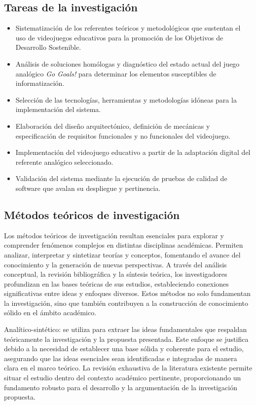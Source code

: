 \subsection*{Tareas de la investigación}

\begin{itemize}
    \item Sistematización de los referentes teóricos y metodológicos que sustentan el uso de videojuegos educativos para la promoción de los Objetivos de Desarrollo Sostenible.
    \item Análisis de soluciones homólogas y diagnóstico del estado actual del juego analógico \textit{Go Goals!} para determinar los elementos susceptibles de informatización.
    \item Selección de las tecnologías, herramientas y metodologías idóneas para la implementación del sistema.
    \item Elaboración del diseño arquitectónico, definición de mecánicas y especificación de requisitos funcionales y no funcionales del videojuego.
    \item Implementación del videojuego educativo a partir de la adaptación digital del referente analógico seleccionado.
    \item Validación del sistema mediante la ejecución de pruebas de calidad de software que avalan su despliegue y pertinencia.
\end{itemize}

\subsection*{Métodos teóricos de investigación}

Los métodos teóricos de investigación resultan esenciales para explorar y comprender fenómenos complejos en distintas disciplinas académicas. Permiten analizar, interpretar y sintetizar teorías y conceptos, fomentando el avance del conocimiento y la generación de nuevas perspectivas. A través del análisis conceptual, la revisión bibliográfica y la síntesis teórica, los investigadores profundizan en las bases teóricas de sus estudios, estableciendo conexiones significativas entre ideas y enfoques diversos. Estos métodos no solo fundamentan la investigación, sino que también contribuyen a la construcción de conocimiento sólido en el ámbito académico.

Analítico-sintético: se utiliza para extraer las ideas fundamentales que respaldan teóricamente la investigación y la propuesta presentada. Este enfoque se justifica debido a la necesidad de establecer una base sólida y coherente para el estudio, asegurando que las ideas esenciales sean identificadas e integradas de manera clara en el marco teórico. La revisión exhaustiva de la literatura existente permite situar el estudio dentro del contexto académico pertinente, proporcionando un fundamento robusto para el desarrollo y la argumentación de la investigación propuesta.

